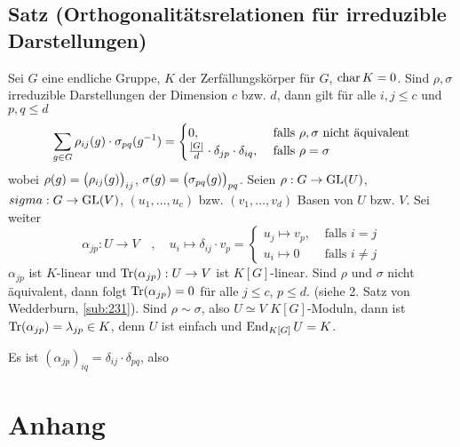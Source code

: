 \subsection{Satz (Orthogonalitätsrelationen für irreduzible Darstellungen)} %
\label{sub:427}
Sei $G$ eine endliche Gruppe, $K$ der Zerfällungskörper für $G$, $\Char K = 0$. Sind $\rho, \sigma$ irreduzible Darstellungen der Dimension $c$
bzw. $d$, dann gilt für alle $i,j \le c$ und $p,q \le d$
\[
	\sum_{g \in G} \rho_{ij}(g) \cdot \sigma_{pq}(g ^{-1}) = \begin{cases}
		0, &\text{ falls }\rho, \sigma \text{ nicht äquivalent}\\
		\frac{\abs*{G} }{d} \cdot \delta_{jp} \cdot \delta_{iq} , &\text{ falls } \rho= \sigma 
	\end{cases}
\]
wobei $\rho(g)= \enbrace[\big]{\rho_{ij}(g)}_{ij} $, $\sigma(g)= \enbrace[\big]{\sigma_{pq}(g)}_{pq}$.
Seien $\rho : G \to \GL(U)$, $\\sigma : G \to \GL(V)$, $(u_1, \ldots , u_c)$ bzw. $(v_1, \ldots , v_d)$ Basen von $U$ bzw. $V$. Sei weiter 
\[
	\alpha_{jp} : U \to V \quad , \quad u_i \mapsto\delta_{ij} \cdot v_p = \begin{cases}
		u_j \mapsto v_p, &\text{ falls } i=j\\
		u_i \mapsto 0 & \text{ falls } i \not= j
	\end{cases}
\]
$\alpha_{jp}$ ist $K$-linear und $\Tr(\alpha_{jp}): U \to V$ ist $K[G]$-linear. Sind $\rho$ und $\sigma$ nicht äquivalent, dann folgt $\Tr(\alpha_{jp})=0$ für alle $j\le c$,
$p \le d$. (siehe 2. Satz von Wedderburn, \ref{sub:231}). Sind $\rho \sim \sigma$, also $U \simeq V$ $K[G]$-Moduln, dann ist $\Tr(\alpha_{jp})= \lambda_{jp} \in K$, denn
$U$ ist einfach und $\End_{K[G]} U = K$.

Es ist $(\alpha_{jp})_{iq} = \delta_{ij} \cdot \delta_{pq}$, also 











\cleardoubleoddemptypage
\appendix
\section{Anhang} %
\label{sec:anhang}
